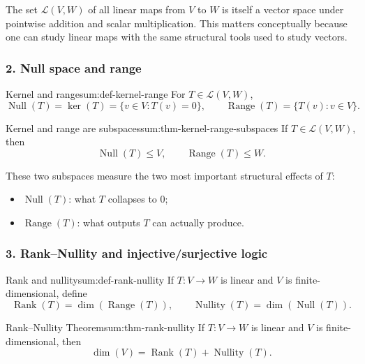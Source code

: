 The set \(\mathcal{L}(V,W)\) of all linear maps from \(V\) to \(W\) is itself a vector space under pointwise addition and scalar multiplication. This matters conceptually because one can study linear maps with the same structural tools used to study vectors.

\subsubsection*{2. Null space and range}

\begin{definition}{Kernel and range}{sum:def-kernel-range}
For \(T\in\mathcal{L}(V,W)\),
\[
\operatorname{Null}(T)=\ker(T)=\{v\in V:T(v)=0\},
\qquad
\operatorname{Range}(T)=\{T(v):v\in V\}.
\]
\end{definition}

\begin{theorem}{Kernel and range are subspaces}{sum:thm-kernel-range-subspaces}
If \(T\in\mathcal{L}(V,W)\), then
\[
\operatorname{Null}(T)\le V,
\qquad
\operatorname{Range}(T)\le W.
\]
\end{theorem}

These two subspaces measure the two most important structural effects of \(T\):
\begin{itemize}[leftmargin=*]
    \item \(\operatorname{Null}(T)\): what \(T\) collapses to \(0\);
    \item \(\operatorname{Range}(T)\): what outputs \(T\) can actually produce.
\end{itemize}

\subsubsection*{3. Rank--Nullity and injective/surjective logic}

\begin{definition}{Rank and nullity}{sum:def-rank-nullity}
If \(T:V\to W\) is linear and \(V\) is finite-dimensional, define
\[
\operatorname{Rank}(T)=\dim(\operatorname{Range}(T)),
\qquad
\operatorname{Nullity}(T)=\dim(\operatorname{Null}(T)).
\]
\end{definition}

\begin{theorem}{Rank--Nullity Theorem}{sum:thm-rank-nullity}
If \(T:V\to W\) is linear and \(V\) is finite-dimensional, then
\[
\dim(V)=\operatorname{Rank}(T)+\operatorname{Nullity}(T).
\]
\end{theorem}

